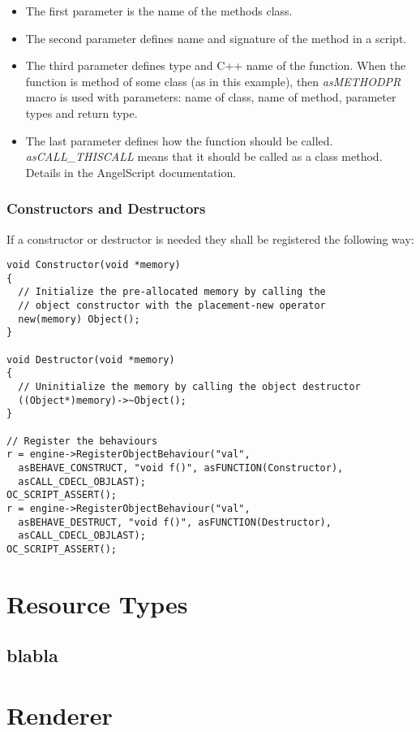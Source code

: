 \documentclass[a4paper, 12pt]{report}
\begin{document}
\begin{itemize}
\item
The first parameter is the name of the methods class.
\item
The second parameter defines name and signature of the method in a script.
\item
The third parameter defines type and C++ name of the function. When the function is method of some class (as in this example), then \emph{asMETHODPR} macro is used with parameters: name of class, name of method, parameter types and return type.
\item
The last parameter defines how the function should be called. \emph{asCALL\_THISCALL} means that it should be called as a class method. Details in the AngelScript documentation.
\end{itemize}

\subsection{Constructors and Destructors}

If a constructor or destructor is needed they shall be registered the following way:

\begin{verbatim}
void Constructor(void *memory)
{
  // Initialize the pre-allocated memory by calling the
  // object constructor with the placement-new operator
  new(memory) Object();
}

void Destructor(void *memory)
{
  // Uninitialize the memory by calling the object destructor
  ((Object*)memory)->~Object();
}

// Register the behaviours
r = engine->RegisterObjectBehaviour("val",
  asBEHAVE_CONSTRUCT, "void f()", asFUNCTION(Constructor),
  asCALL_CDECL_OBJLAST);
OC_SCRIPT_ASSERT();
r = engine->RegisterObjectBehaviour("val",
  asBEHAVE_DESTRUCT, "void f()", asFUNCTION(Destructor),
  asCALL_CDECL_OBJLAST);
OC_SCRIPT_ASSERT();

\end{verbatim}


\chapter{Resource Types}

\section{blabla}

\chapter{Renderer}
\end{document}
